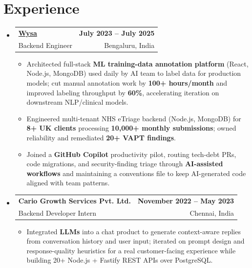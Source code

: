 \documentclass[letterpaper,10pt]{article}
\makeatletter
\newcommand{\resumeItem}[1]{
  \item\small{#1\vspace{-1pt}}
}
\newcommand{\resumeSubheading}[4]{
  \vspace{1pt}\item
    \begin{tabular*}{0.985\textwidth}[t]{l@{\extracolsep{\fill}}r}
      \textbf{#1} & \textbf{\small #2} \\
      {\small\color{ResumeSlate} #3} & {\small\color{ResumeSlate} #4} \\
    \end{tabular*}\vspace{-6pt}
}
\newcommand{\resumeSubHeadingListStart}{\begin{itemize}[leftmargin=0.0in, label={}, itemsep=2pt, topsep=2pt]}
\newcommand{\resumeSubHeadingListEnd}{\end{itemize}}
\newcommand{\resumeItemListStart}{\begin{itemize}[leftmargin=0.18in, itemsep=2pt, topsep=1pt]}
\newcommand{\resumeItemListEnd}{\end{itemize}\vspace{-4pt}}
\makeatother
\begin{document}
\section{Experience}
\resumeSubHeadingListStart
  \resumeSubheading
    {\href{https://www.wysa.io}{Wysa}}{July 2023 -- July 2025}
    {Backend Engineer}{Bengaluru, India}
    \resumeItemListStart
      \resumeItem{Architected full-stack \textbf{ML training-data annotation platform} (React, Node.js, MongoDB) used daily by AI team to label data for production models; cut manual annotation work by \textbf{100+ hours/month} and improved labeling throughput by \textbf{60\%}, accelerating iteration on downstream NLP/clinical models.}
      \resumeItem{Engineered multi-tenant NHS eTriage backend (Node.js, MongoDB) for \textbf{8+ UK clients} processing \textbf{10{,}000+ monthly submissions}; owned reliability and remediated \textbf{20+ VAPT findings}.}
      \resumeItem{Joined a \textbf{GitHub Copilot} productivity pilot, routing tech-debt PRs, code migrations, and security-finding triage through \textbf{AI-assisted workflows} and maintaining a conventions file to keep AI-generated code aligned with team patterns.}
    \resumeItemListEnd
  \resumeSubheading
    {Cario Growth Services Pvt. Ltd.}{November 2022 -- May 2023}
    {Backend Developer Intern}{Chennai, India}
    \resumeItemListStart
      \resumeItem{Integrated \textbf{LLMs} into a chat product to generate context-aware replies from conversation history and user input; iterated on prompt design and response-quality heuristics for a real customer-facing experience while building 20+ Node.js + Fastify REST APIs over PostgreSQL.}
    \resumeItemListEnd
\resumeSubHeadingListEnd
\vspace{-4pt}
\end{document}
